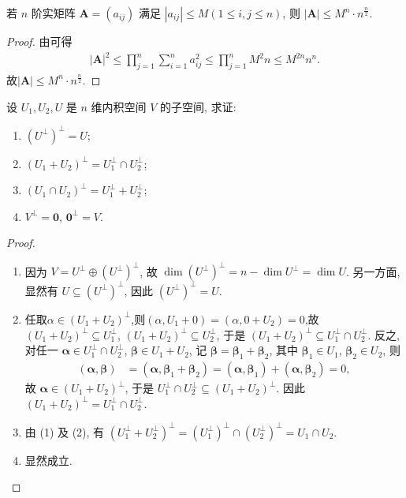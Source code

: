 \documentclass[../../main.tex]{subfiles}%
\begin{document}
\begin{corollary}\label{corollary:矩阵的Hadamard不等式的推论}
若 $n$ 阶实矩阵 $\boldsymbol{A} = (a_{ij})$ 满足 $|a_{ij}| \leqslant  M (1 \leqslant  i, j \leqslant  n)$, 则 $|\boldsymbol{A}| \leqslant  M^n \cdot n^{\frac{n}{2}}$. 
\end{corollary}
\begin{proof}

由可得
\begin{align*}
|\boldsymbol{A}|^2\leqslant   \prod_{j = 1}^{n} \sum_{i = 1}^{n} a_{ij}^2 \leqslant  \prod_{j = 1}^{n}M^2n \leqslant   M^{2n}n^n.
\end{align*}
故$|\boldsymbol{A}| \leqslant  M^n \cdot n^{\frac{n}{2}}$. 

\end{proof}

\begin{proposition}\label{proposition:例9.18}
设 $U_1,U_2,U$ 是 $n$ 维内积空间 $V$ 的子空间, 求证:
\begin{enumerate}[(1)]
\item $(U^\perp)^\perp = U$;
\item $(U_1 + U_2)^\perp = U_1^\perp \cap U_2^\perp$;
\item $(U_1 \cap U_2)^\perp = U_1^\perp + U_2^\perp$;
\item $V^\perp = \boldsymbol{0}$, $\boldsymbol{0}^\perp = V$.
\end{enumerate}
\end{proposition}
\begin{proof}
\begin{enumerate}[(1)]
\item 因为 $V = U^\perp \oplus (U^\perp)^\perp$, 故 $\dim (U^\perp)^\perp = n - \dim U^\perp = \dim U$. 另一方面, 显然有 $U \subseteq (U^\perp)^\perp$, 因此 $(U^\perp)^\perp = U$.
\item 任取$\alpha\in (U_1+U_2)^\perp$,则$(\alpha,U_1+0)=(\alpha,0+U_2)=0 $,故$(U_1 + U_2)^\perp \subseteq U_1^\perp$, $(U_1 + U_2)^\perp \subseteq U_2^\perp$, 于是 $(U_1 + U_2)^\perp \subseteq U_1^\perp \cap U_2^\perp$. 反之, 对任一 $\boldsymbol{\alpha} \in U_1^\perp \cap U_2^\perp$, $\boldsymbol{\beta} \in U_1 + U_2$, 记 $\boldsymbol{\beta} = \boldsymbol{\beta}_1 + \boldsymbol{\beta}_2$, 其中 $\boldsymbol{\beta}_1 \in U_1$, $\boldsymbol{\beta}_2 \in U_2$, 则
\begin{align*}
(\boldsymbol{\alpha},\boldsymbol{\beta}) &= (\boldsymbol{\alpha},\boldsymbol{\beta}_1 + \boldsymbol{\beta}_2) = (\boldsymbol{\alpha},\boldsymbol{\beta}_1) + (\boldsymbol{\alpha},\boldsymbol{\beta}_2) = 0,
\end{align*}
故 $\boldsymbol{\alpha} \in (U_1 + U_2)^\perp$, 于是 $U_1^\perp \cap U_2^\perp \subseteq (U_1 + U_2)^\perp$. 因此 $(U_1 + U_2)^\perp = U_1^\perp \cap U_2^\perp$.
\item 由 (1) 及 (2), 有 $(U_1^\perp + U_2^\perp)^\perp = (U_1^\perp)^\perp \cap (U_2^\perp)^\perp = U_1 \cap U_2$.
\item 显然成立. 
\end{enumerate} 

\end{proof}
\end{document}
